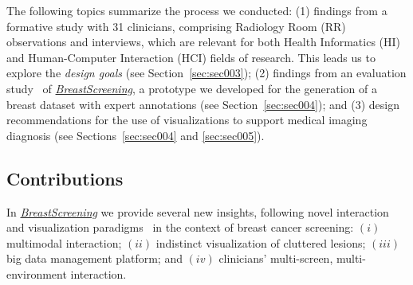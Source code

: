 The following topics summarize the process we conducted:
(1) findings from a formative study with 31 clinicians, comprising Radiology Room (RR) observations and interviews, which are relevant for both Health Informatics (HI) and Human-Computer Interaction (HCI) fields of research.
This leads us to explore the {\it design goals} (see Section~\ref{sec:sec003});
(2) findings from an evaluation study~\cite{https://doi.org/10.13140/rg.2.2.16566.14403/1} of \hyperlink{https://breastscreening.github.io/}{{\it BreastScreening}}, a prototype we developed for the generation of a breast dataset with expert annotations (see Section~\ref{sec:sec004}); and
(3) design recommendations for the use of visualizations to support medical imaging diagnosis (see Sections~\ref{sec:sec004} and \ref{sec:sec005}).

\subsection{Contributions}

In \hyperlink{https://breastscreening.github.io/}{{\it BreastScreening}} we provide several new insights, following novel interaction and visualization paradigms~\cite{PAULO2019103316} in the context of breast cancer screening:
$(i)$ multimodal interaction;
$(ii)$ indistinct visualization of cluttered lesions;
$(iii)$ big data management platform; and
$(iv)$ clinicians' multi-screen, multi-environment interaction.